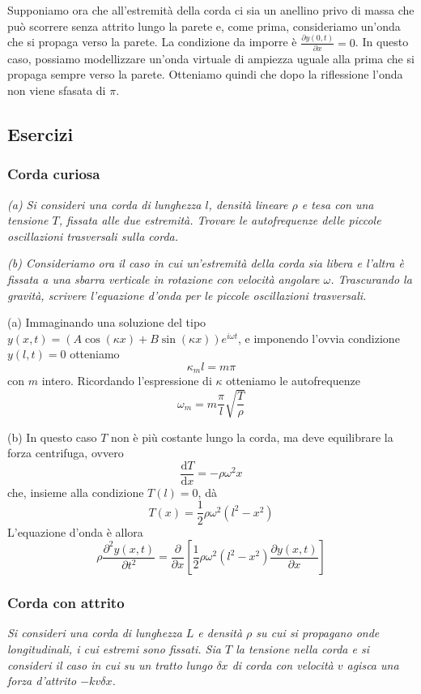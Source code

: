 \documentclass[a4paper,11pt]{article}
\begin{document}
\noindent Supponiamo ora che all'estremità della corda ci sia un anellino privo di massa che può scorrere senza attrito lungo la parete e, come prima, consideriamo un'onda che si propaga verso la parete. La condizione da imporre è $\frac{\partial y(0,t)}{\partial x}=0$. In questo caso, possiamo modellizzare un'onda virtuale di ampiezza uguale alla prima che si propaga sempre verso la parete. Otteniamo quindi che dopo la riflessione l'onda non viene sfasata di $\pi$.

\subsection{Esercizi}
\subsubsection{Corda curiosa}
\textit{(a) Si consideri una corda di lunghezza $l$, densità lineare $\rho$ e tesa con una tensione $T$, fissata alle due estremità. Trovare le autofrequenze delle piccole oscillazioni trasversali sulla corda.}

\noindent \textit{(b) Consideriamo ora il caso in cui un'estremità della corda sia libera e l'altra è fissata a una sbarra verticale in rotazione con velocità angolare $\omega$. Trascurando la gravità, scrivere l'equazione d'onda per le piccole oscillazioni trasversali.}
\vspace{5mm}

\noindent (a) Immaginando una soluzione del tipo $y(x,t)=\left(A\cos(\kappa x)+B\sin(\kappa x)\right)e^{i\omega t}$, e imponendo l'ovvia condizione $y(l,t)=0$ otteniamo
\[\kappa_m l=m\pi\]
con $m$ intero. Ricordando l'espressione di $\kappa$ otteniamo le autofrequenze
\[\omega_m=m\frac{\pi}{l}\sqrt{\frac{T}{\rho}}\]

\noindent (b) In questo caso $T$ non è più costante lungo la corda, ma deve equilibrare la forza centrifuga, ovvero
\[\frac{\mathrm{d}T}{\mathrm{d}x}=-\rho\omega^2x\]
che, insieme alla condizione $T(l)=0$, dà
\[T(x)=\frac{1}{2}\rho\omega^2(l^2-x^2)\]
L'equazione d'onda è allora
\[\rho\frac{\partial^2y(x,t)}{\partial t^2}=\frac{\partial}{\partial x}\left[\frac{1}{2}\rho\omega^2(l^2-x^2)\frac{\partial y(x,t)}{\partial x}\right]\]

\subsubsection{Corda con attrito}
\textit{Si consideri una corda di lunghezza $L$ e densità $\rho$ su cui si propagano onde longitudinali, i cui estremi sono fissati. Sia $T$ la tensione nella corda e si consideri il caso in cui su un tratto lungo $\delta x$ di corda con velocità $v$ agisca una forza d'attrito $-kv\delta x$.}
\end{document}
